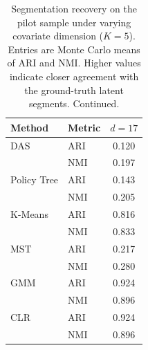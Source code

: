 \begin{table}[htbp]
\centering
\caption{Segmentation recovery on the pilot sample under varying covariate dimension ($K=5$). Entries are Monte Carlo means of ARI and NMI. Higher values indicate closer agreement with the ground-truth latent segments. Continued.}
\label{tab:app-ari-nmi-varying-d-cont}
\begin{tabular}{llc}
\toprule
Method & Metric & $d=17$ \\
\midrule
DAS & ARI & 0.120 \\
 & NMI & 0.197 \\
\addlinespace
Policy Tree & ARI & 0.143 \\
 & NMI & 0.205 \\
\addlinespace
K-Means & ARI & 0.816 \\
 & NMI & 0.833 \\
\addlinespace
MST & ARI & 0.217 \\
 & NMI & 0.280 \\
\addlinespace
GMM & ARI & 0.924 \\
 & NMI & 0.896 \\
\addlinespace
CLR & ARI & 0.924 \\
 & NMI & 0.896 \\
\bottomrule
\end{tabular}
\end{table}
